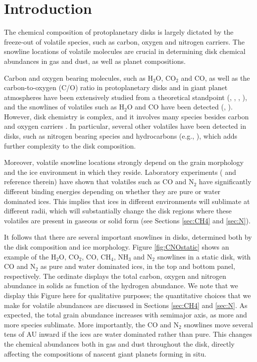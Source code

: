 \documentclass[apj]{emulateapj}
\begin{document}
\section{Introduction}
\label{sec:intro}

The chemical composition of protoplanetary disks is largely dictated by the freeze-out of volatile species, such as carbon, oxygen and nitrogen carriers. The snowline locations of volatile molecules are crucial in determining disk chemical abundances in gas and dust, as well as planet compositions.  

Carbon and oxygen bearing molecules, such as H$_2$O, CO$_2$ and CO, as well as the carbon-to-oxygen (C/O) ratio in protoplanetary disks and in giant planet atmospheres have been extensively studied from a theoretical standpoint (\citealt{oberg11}, \citealt{alidib14}, \citealt{madhu14}, \citealt{molliere15}), and the snowlines of volatiles such as H$_2$O and CO have been detected (\citealt{zhang13}, \citealt{qi13}). However, disk chemistry is complex, and it involves many species besides carbon and oxygen carriers \citep{henning13}. In particular, several other volatiles have been detected in disks, such as nitrogen bearing species and hydrocarbons (e.g., \citealt{mandell12}), which adds further complexity to the disk composition.


Moreover, volatile snowline locations strongly depend on the grain morphology and the ice environment in which they reside. Laboratory experiments (\citealt{fayolle16} and reference therein) have shown that volatiles such as CO and N$_2$ have significantly different binding energies depending on whether they are pure or water dominated ices. This implies that ices in different environments will sublimate at different radii, which will substantially change the disk regions where these volatiles are present in gaseous or solid form (see Sections \ref{sec:CH4} and \ref{sec:N}).  

 It follows that there are several important snowlines in disks, determined both by the disk composition and ice morphology. Figure \ref{fig:CNOstatic} shows an example of the H$_2$O, CO$_2$, CO, CH$_4$, NH$_3$ and N$_2$ snowlines in a static disk, with CO and N$_2$ as pure and water dominated ices, in the top and bottom panel, respectively. The ordinate displays the total carbon, oxygen and nitrogen abundance in solids as function of the hydrogen abundance. We note that we display this Figure here for qualitative purposes; the quantitative choices that we make for volatile abundances are discussed in Sections \ref{sec:CH4} and \ref{sec:N}. As expected, the total grain abundance increases with semimajor axis, as more and more species sublimate. More importantly, the CO and N$_2$ snowlines move several tens of AU inward if the ices are water dominated rather than pure. This changes the chemical abundances both in gas and dust throughout the disk, directly affecting the compositions of nascent giant planets forming in situ. 
 
\end{document}
